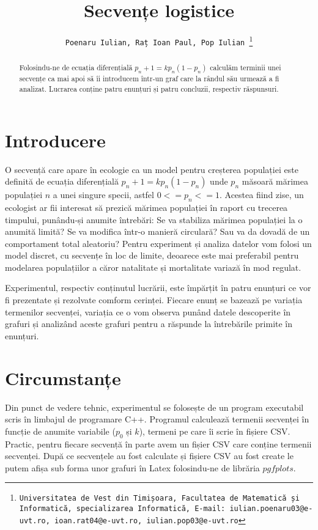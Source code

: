 \documentclass[a4paper,12pt]{article}
\title{\bf Secvențe logistice}
\author{\tt Poenaru Iulian, Raț Ioan Paul, Pop Iulian \thanks{Universitatea de Vest din Timișoara, Facultatea de Matematică și Informatică, specializarea Informatică, E-mail: iulian.poenaru03@e-uvt.ro, ioan.rat04@e-uvt.ro, iulian.pop03@e-uvt.ro}}
\date{}
\begin{document}
\maketitle

\begin{abstract}
Folosindu-ne de ecuația diferențială $p_n+1 = kp_n(1-p_n)$ calculăm terminii unei secvențe ca mai apoi să îi introducem într-un graf care la rândul său urmează a fi analizat. Lucrarea conține patru enunțuri și patru concluzii, respectiv răspunsuri.
\end{abstract}

\section{Introducere}
O secvență care apare în ecologie ca un model pentru creșterea populației este definită de ecuația diferențială $p_n+1 = kp_n(1-p_n)$ unde $p_n$ măsoară mărimea populației $n$ a unei singure specii, astfel $0<=p_n<=1$. Acestea fiind zise, un ecologist ar fii interesat să prezică mărimea populației în raport cu trecerea timpului, punându-și anumite întrebări: Se va stabiliza mărimea populației la o anumită limită? Se va modifica într-o manieră circulară? Sau va da dovadă de un comportament total aleatoriu? Pentru experiment și analiza datelor vom folosi un model discret, cu secvențe în loc de limite, deoarece este mai preferabil pentru modelarea populațiilor a căror natalitate și mortalitate variază în mod regulat.

Experimentul, respectiv conținutul lucrării, este împărțit în patru enunțuri ce vor fi prezentate și rezolvate comform cerinței. Fiecare enunț se bazează pe variația termenilor secvenței, variația ce o vom observa punând datele descoperite în grafuri și analizând aceste grafuri pentru a răspunde la întrebările primite în enunțuri.



\section{Circumstanțe}

Din punct de vedere tehnic, experimentul se folosește de un program executabil scris în limbajul de programare C++. Programul calculează termenii secvenței în funcție de anumite variabile ($p_0$ și $k$), termeni pe care îi scrie în fișiere CSV. Practic, pentru fiecare secvență în parte avem un fișier CSV care conține termenii secvenței. După ce secvențele au fost calculate și fișiere CSV au fost create le putem afișa sub forma unor grafuri în Latex folosindu-ne de librăria $pgfplots$.
\end{document}
